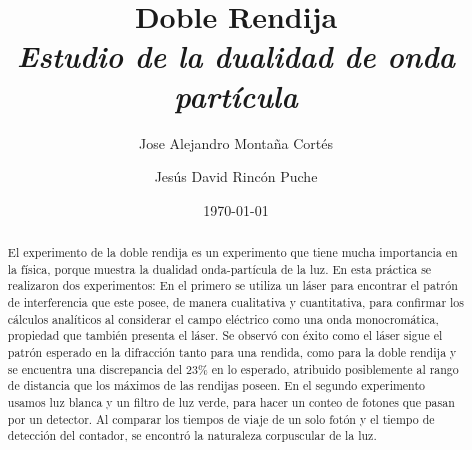 \documentclass[%
 reprint,
 amsmath,amssymb,
 aps,
]{revtex4-1}
\newcommand{\subtitle}[1]{%
\posttitle{%
    \par\end{center}
\begin{center}\large#1\end{center}
\vskip0.5em}%
}
\begin{document}

\title{Doble Rendija\\ \textit{Estudio de la dualidad de onda partícula} }%


\author{Jose Alejandro Montaña Cortés}
\author{Jesús David Rincón Puche}%
%


\date{\today}%

\begin{abstract}

El experimento de la doble rendija es un experimento que tiene mucha importancia en la física, porque muestra la dualidad onda-partícula de la luz. En esta práctica se realizaron dos experimentos: En el primero se utiliza un láser para encontrar el patrón de interferencia que este posee, de manera cualitativa y cuantitativa, para confirmar los cálculos analíticos al considerar el campo eléctrico como una onda monocromática, propiedad que también presenta el láser. Se observó con éxito como el láser sigue el patrón esperado en la difracción tanto para una rendida, como para la doble rendija y se encuentra una discrepancia del 23\% en lo esperado, atribuido posiblemente al rango de distancia que los máximos de las rendijas poseen. En el segundo experimento usamos luz blanca y un filtro de luz verde, para hacer un conteo de fotones que pasan por un detector. Al comparar los tiempos de viaje de un solo fotón y el tiempo de detección del contador, se encontró la naturaleza corpuscular de la luz.

\end{abstract}
\maketitle

\end{document}
